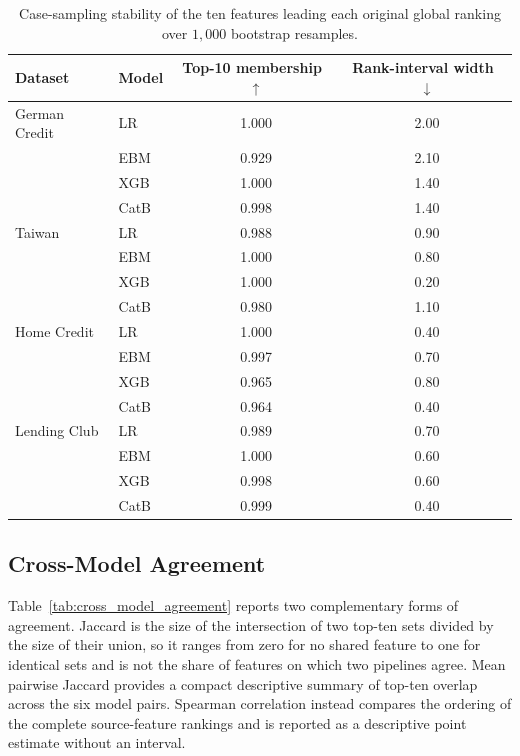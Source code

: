 \begin{table}[htbp]
\centering
\small
\begin{tabular}{llcc}
\toprule
\textbf{Dataset} & \textbf{Model} & \textbf{Top-10 membership}~$\uparrow$ & \textbf{Rank-interval width}~$\downarrow$ \\
\midrule
German Credit & LR & 1.000 & 2.00 \\
 & EBM & 0.929 & 2.10 \\
 & XGB & 1.000 & 1.40 \\
 & CatB & 0.998 & 1.40 \\
\midrule
Taiwan & LR & 0.988 & 0.90 \\
 & EBM & 1.000 & 0.80 \\
 & XGB & 1.000 & 0.20 \\
 & CatB & 0.980 & 1.10 \\
\midrule
Home Credit & LR & 1.000 & 0.40 \\
 & EBM & 0.997 & 0.70 \\
 & XGB & 0.965 & 0.80 \\
 & CatB & 0.964 & 0.40 \\
\midrule
Lending Club & LR & 0.989 & 0.70 \\
 & EBM & 1.000 & 0.60 \\
 & XGB & 0.998 & 0.60 \\
 & CatB & 0.999 & 0.40 \\
\bottomrule
\end{tabular}
\caption[Global attribution-rank stability under case resampling]{Case-sampling
stability of the ten features leading each original global ranking over $1{,}000$
bootstrap resamples.}
\label{tab:shap_stability}
\end{table}

\FloatBarrier

\subsection{Cross-Model Agreement}

Table~\ref{tab:cross_model_agreement} reports two complementary forms of agreement.
Jaccard is the size of the intersection of two top-ten sets divided by the size of their
union, so it ranges from zero for no shared feature to one for identical sets and is not
the share of features on which two pipelines agree. Mean pairwise Jaccard provides a
compact descriptive summary of top-ten overlap across the six model pairs. Spearman
correlation instead compares the ordering of the complete source-feature rankings and is
reported as a descriptive point estimate without an interval.

